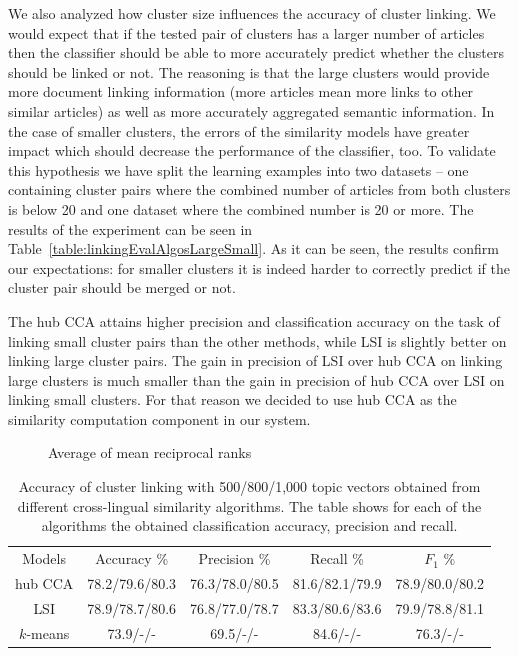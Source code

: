\documentclass[twoside,11pt]{article}
\begin{document}
We also analyzed how cluster size influences the accuracy of cluster linking. We would expect that if the tested pair of clusters has a larger number of articles then the classifier should be able to more accurately predict whether the clusters should be linked or not. The reasoning is that the large clusters would provide more document linking information (more articles mean more links to other similar articles) as well as more accurately aggregated semantic information. In the case of smaller clusters, the errors of the similarity models have greater impact which should decrease the performance of the classifier, too. To validate this hypothesis we have split the learning examples into two datasets -- one containing cluster pairs where the combined number of articles from both clusters is below 20 and one dataset where the combined number is 20 or more. The results of the experiment can be seen in Table~\ref{table:linkingEvalAlgosLargeSmall}. As it can be seen, the results confirm our expectations: for smaller clusters it is indeed harder to correctly predict if the cluster pair should be merged or not.

The hub CCA attains higher precision and classification accuracy on the task of linking small cluster pairs than the other methods, while LSI is slightly better on linking large cluster pairs. The gain in precision of LSI over hub CCA on linking large clusters is much smaller than the gain in precision of hub CCA over LSI on linking small clusters. For that reason we decided to use hub CCA as the similarity computation component in our system.

\begin{figure}
\centering

\caption{Average of mean reciprocal ranks}
\label{pic:AMRR}
\end{figure}

\begin{table}[h]
\caption{Accuracy of cluster linking with 500/800/1,000 topic vectors obtained from different cross-lingual similarity algorithms. The table shows for each of the algorithms the obtained classification accuracy, precision and recall.}
\label{table:linkingEvalAlgos}
\begin{center}
\begin{tabular}{|c|c|c|c|c|}
  \hline
  \cline{1-5}
  Models & Accuracy \% & Precision \% & Recall \% & $F_1$ \% \\ \cline{1-5}
  hub CCA  & 78.2/79.6/80.3 & 76.3/78.0/80.5  & 81.6/82.1/79.9 & 78.9/80.0/80.2
  \\ \cline{1-5}
  LSI      & 78.9/78.7/80.6  & 76.8/77.0/78.7 & 83.3/80.6/83.6 & 79.9/78.8/81.1  \\ \cline{1-5}
 $k$-means & 73.9/-/- & 69.5/-/- & 84.6/-/- &  76.3/-/- \\ \cline{1-5}
\end{tabular}
\end{center}
\end{table}
\end{document}
